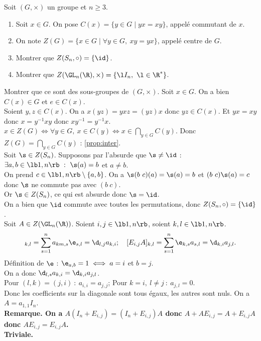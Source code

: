 \documentclass[11pt]{article}
\begin{document}
\begin{exi}{}{}
    Soit $(G,\times)$ un groupe et $n\geq3$.
    \begin{enumerate}
        \item Soit $x\in G$. On pose $C(x)=\{y\in G \mid yx=xy\}$, appelé commutant de $x$.
        \item On note $Z(G)=\{x\in G \mid \forall y \in G, ~ xy=yx\}$, appelé centre de $G$.
        \item Montrer que $Z(S_n,\circ)=\{\id\}$.
        \item Montrer que $Z(\GL_n(\R),\times)=\{\l I_n, ~ \l \in \R^*\}$.
    \end{enumerate}
    Montrer que ce sont des sous-groupes de $(G,\times)$.
    \tcblower
     Soit $x\in G$. On a bien $C(x)\in G$ et $e\in C(x)$.\\
    Soient $y,z\in C(x)$. On a $x(yz)=yxz=(yz)x$ donc $yz\in C(x)$. Et $yx=xy$ donc $x=y^{-1}xy$ donc $xy^{-1}=y^{-1}x$.\\
     $x\in Z(G)\iff \forall y \in G, ~ x \in C(y) \iff x \in \bigcap_{y\in G}C(y)$. Donc $Z(G)=\bigcap_{y\in G}C(y)$ : \ref{prop:inter}.\\
     Soit $\s\in Z(S_n)$. Supposons par l'absurde que $\s\neq\id$ : $\exists a,b\in\lb1,n\rb ~ : ~ \s(a)=b$ et $a\neq b$.\\
    On prend $c\in\lb1,n\rb\setminus\{a,b\}$. On a $\s(b~c)(a)=\s(a)=b$ et $(b~c)\s(a)=c$ donc $\s$ ne commute pas avec $(b~c)$.\\
    Or $\s\in Z(S_n)$, ce qui est absurde donc $\s=\id$.\\
     On a bien que $\id$ commute avec toutes les permutations, donc $Z(S_n,\circ)=\{\id\}$.\\
     Soit $A\in Z(\GL_n(\R))$. Soient $i,j\in\lb1,n\rb$, soient $k,l\in\lb1,n\rb$.
    \begin{equation*}
        [AE_{i,j}]_{k,l}=\sum_{s=1}^na_{km,s}\e_{s,l}=\d_{l,j}a_{k,i}; \quad [E_{i,j}A]_{k,l}=\sum_{s=1}^n\e_{k,s}a_{s,l}=\d_{k,i}a_{j,l}.
    \end{equation*}
    Définition de $\e$ : $\e_{a,b}=1\iff a=i$ et $b=j$.\\
    On a donc $\d_{l,s}a_{k,i}=\d_{k,i}a_{j,l}$.\\
    Pour $(l,k)=(j,i) ~:~ a_{i,i}=a_{j,j}$; Pour $k=i, ~ l\neq j ~:~ a_{j,l}=0$.\\
    Donc les coefficients sur la diagonale sont tous égaux, les autres sont nuls. On a $A=a_{1,1}I_n$.\\
    \bf{Remarque.} On a $A(I_n+E_{i,j})=(I_n+E_{i,j})A$ donc $A+AE_{i,j}=A+E_{i,j}A$ donc $AE_{i,j}=E_{i,j}A$.\\
     Triviale.
\end{exi}
\end{document}
